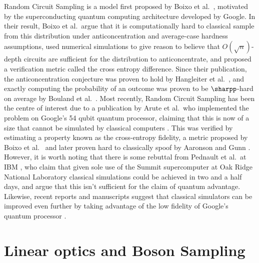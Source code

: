 Random Circuit Sampling is a model first proposed by Boixo et al.~\cite{boixo2018}, motivated by the superconducting quantum computing architecture developed by Google. In their result, Boixo et al.\ argue that it is computationally hard to classical sample from this distribution under anticoncentration and average-case hardness assumptions, used numerical simulations to give reason to believe that $O(\sqrt{n})$-depth circuits are sufficient for the distribution to anticoncentrate, and proposed a verification metric called the cross entropy difference. Since their publication, the anticoncentration conjecture was proven to hold by Hangleiter et al.~\cite{hangleiter2018}, and exactly computing the probability of an outcome was proven to be $\sharpp$-hard on average by Bouland et al.~\cite{bouland2018}. Most recently, Random Circuit Sampling has been the centre of interest due to a publication by Arute et al.\ who implemented the problem on Google's 54 qubit quantum processor, claiming that this is now of a size that cannot be simulated by classical computers \cite{arute2019}. This was verified by estimating a property known as the cross-entropy fidelity, a metric proposed by Boixo et al.~\cite{boixo2018} and later proven hard to classically spoof by Aaronson and Gunn \cite{aaronson2019}. However, it is worth noting that there is some rebuttal from Pednault et al.\ at IBM \cite{pednault2019}, who claim that given sole use of the Summit supercomputer at Oak Ridge National Laboratory classical simulations could be achieved in two and a half days, and argue that this isn't sufficient for the claim of quantum advantage.  Likewise, recent reports and manuscripts suggest that classical simulators can be improved even further by taking advantage of the low fidelity of Google's quantum processor \cite{morimae2019google, zhou2020}.

\section{Linear optics and Boson Sampling}
\label{sec:lo-bs}

